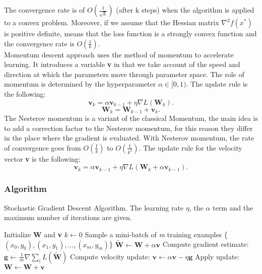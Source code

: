 The convergence rate is of $O(\frac{1}{\sqrt{k}})$ (after k steps) when the algorithm is applied to a convex problem. 
Moreover, if we assume that the Hessian matrix $\nabla^2f(x^*)$ is positive definite, means that the loss function is a strongly convex function and the convergence rate is $O(\frac{1}{k})$. \cite{goodfellow}
\\
Momentum descent approach uses the method of momentum to accelerate learning. It introduces a variable \textbf{v} in that we take account of the speed and direction at which the parameters move through parameter space. The role of momentum is determined by the hyperparameter $\alpha\in[0,1)$.
The update rule is the following:
\begin{equation}
\label{classical_momentum}
\textbf{v}_k = \alpha\textbf{v}_{k-1} + \eta\nabla\textit{L}(\textbf{W}_k).
\end{equation}
\begin{equation}
\label{update_momentum}
\textbf{W}_k = \textbf{W}_{k-1}  + \textbf{v}_k.
\end{equation}
The Nesterov momentum is a variant of the classical Momentum, the main idea is to add a correction factor to the Nesterov momentum,  for this reason they differ in the place where the gradient is evaluated. With Nesterov momentum, the rate of convergence goes from $O(\frac{1}{k})$ to $O(\frac{1}{k^2})$.
The update rule for the velocity vector \textbf{v} is the following:
\begin{equation}
\label{nesterov_momentum}
\textbf{v}_k = \alpha\textbf{v}_{k-1} + \eta\nabla\textit{L}(\textbf{W}_k + \alpha\textbf{v}_{k-1}).
\end{equation}
\subsubsection{Algorithm}
\begin{algorithm}[H]
	\caption{Stochastic Gradient Descent Algorithm. The learning rate $\eta$, the $\alpha$ term and the maximum number of iterations are given.}
	\label{alg:sgd}
	\begin{algorithmic}[1]
		\State Initialize \textbf{W} and \textbf{v}
		\State $k \gets 0$
		\State Sample a mini-batch of \textit{m} training examples \{\textit{$(x_0,y_0),(x_1,y_1),...,(x_m,y_m)$}\}
		\State $\tilde{\textbf{W}} \gets \textbf{W} + \alpha \textbf{v}$
		\EndIf
		\State Compute gradient estimate: $\textbf{g} \gets \frac {1}{m} \nabla \sum_i\textit{L}(\tilde{\textbf{W}})$
		\State Compute velocity update: $\textbf{v} \gets \alpha \textbf{v} - \eta \textbf{g}$
		\State Apply update: $\textbf{W} \gets \textbf{W} + \textbf{v}$
		\EndWhile
		\EndProcedure
	\end{algorithmic}
\end{algorithm}

